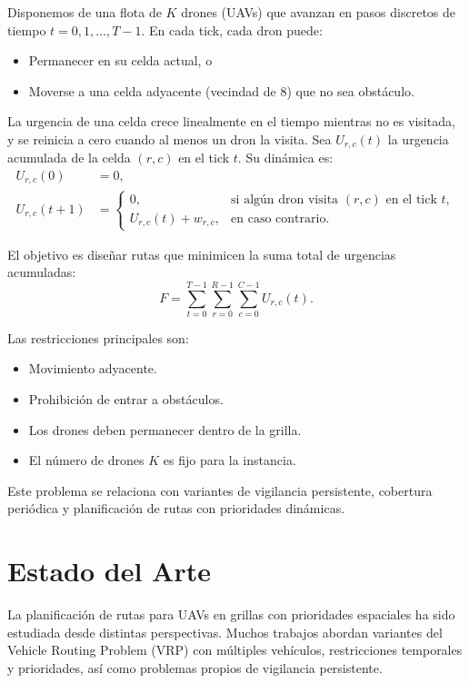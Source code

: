 \documentclass[11pt,a4paper]{article}
\begin{document}
Disponemos de una flota de $K$ drones (UAVs) que avanzan en pasos discretos de tiempo $t = 0,1,\dots,T-1$. En cada tick, cada dron puede:
\begin{itemize}
    \item Permanecer en su celda actual, o
    \item Moverse a una celda adyacente (vecindad de 8) que no sea obstáculo.
\end{itemize}

La urgencia de una celda crece linealmente en el tiempo mientras no es visitada, y se reinicia a cero cuando al menos un dron la visita. Sea $U_{r,c}(t)$ la urgencia acumulada de la celda $(r,c)$ en el tick $t$. Su dinámica es:
\begin{align}
    U_{r,c}(0) &= 0, \\
    U_{r,c}(t+1) &=
    \begin{cases}
        0, & \text{si algún dron visita $(r,c)$ en el tick } t,\\
        U_{r,c}(t) + w_{r,c}, & \text{en caso contrario}.
    \end{cases}
\end{align}

El objetivo es diseñar rutas que minimicen la suma total de urgencias acumuladas:
\begin{equation}
    \label{eq:fo}
    F = \sum_{t=0}^{T-1} \sum_{r=0}^{R-1} \sum_{c=0}^{C-1} U_{r,c}(t).
\end{equation}

Las restricciones principales son:
\begin{itemize}
    \item Movimiento adyacente.
    \item Prohibición de entrar a obstáculos.
    \item Los drones deben permanecer dentro de la grilla.
    \item El número de drones $K$ es fijo para la instancia.
\end{itemize}

Este problema se relaciona con variantes de vigilancia persistente, cobertura periódica y planificación de rutas con prioridades dinámicas.



\section{Estado del Arte}
\label{sec:estadoarte}

La planificación de rutas para UAVs en grillas con prioridades espaciales ha sido estudiada desde distintas perspectivas. Muchos trabajos abordan variantes del Vehicle Routing Problem (VRP) con múltiples vehículos, restricciones temporales y prioridades, así como problemas propios de vigilancia persistente.
\end{document}
